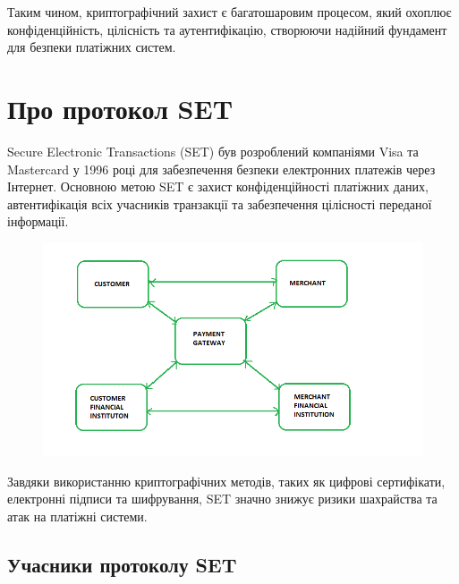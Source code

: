 Таким чином, криптографічний захист є багатошаровим процесом, який охоплює конфіденційність, цілісність та аутентифікацію, створюючи надійний фундамент для безпеки платіжних систем.

\section{Про протокол SET}


Secure Electronic Transactions (SET) був розроблений компаніями Visa та Mastercard у 1996 році для забезпечення безпеки електронних платежів через Інтернет. Основною метою SET є захист конфіденційності платіжних даних, автентифікація всіх учасників транзакції та забезпечення цілісності переданої інформації. 

\begin{figure}[ht]
        \centering
        \includegraphics[scale=0.8]{../IMAGES/transaction-scenario.png}
        \label{transaction-scenario}
    \end{figure}


Завдяки використанню криптографічних методів, таких як цифрові сертифікати, електронні підписи та шифрування, SET значно знижує ризики шахрайства та атак на платіжні системи.

\subsection{Учасники протоколу SET}

